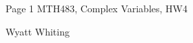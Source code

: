 \documentclass{article}
\begin{document}
\large %


{\Large Page 1 %
\hfill  MTH483, Complex Variables, HW4}

\begin{center}
{\Large Wyatt Whiting}
\end{center}
\vspace{0.05in}

\end{document}
